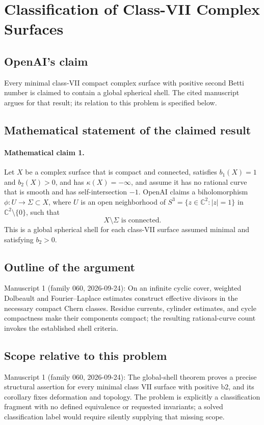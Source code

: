 \documentclass[11pt]{article}
\begin{document}
\section*{Classification of Class-VII Complex Surfaces}

\subsection{OpenAI's claim}
Every minimal class-VII compact complex surface with positive second Betti number is claimed to contain a global spherical shell. The cited manuscript argues for that result; its relation to this problem is specified below.

\subsection{Mathematical statement of the claimed result}
\paragraph{Mathematical claim 1.} Let $X$ be a complex surface that is compact and connected, satisfies $b_1(X)=1$ and $b_2(X)>0$, and has $\kappa(X)=-\infty$, and assume it has no rational curve that is smooth and has self-intersection $-1$. OpenAI claims a biholomorphism $\phi:U\to\Sigma\subset X$, where $U$ is an open neighborhood of $S^3=\{z\in\mathbb C^2:|z|=1\}$ in $\mathbb C^2\setminus\{0\}$, such that
\[
X\setminus\Sigma\text{ is connected}.
\]
This is a global spherical shell for each class-VII surface assumed minimal and satisfying $b_2>0$.

\subsection{Outline of the argument}
Manuscript 1 (family 060, 2026-09-24): On an infinite cyclic cover, weighted Dolbeault and Fourier--Laplace estimates construct effective divisors in the necessary compact Chern classes. Residue currents, cylinder estimates, and cycle compactness make their components compact; the resulting rational-curve count invokes the established shell criteria.

\subsection{Scope relative to this problem}
Manuscript 1 (family 060, 2026-09-24): The global-shell theorem proves a precise structural assertion for every minimal class VII surface with positive b2, and its corollary fixes deformation and topology. The problem is explicitly a classification fragment with no defined equivalence or requested invariants; a solved classification label would require silently supplying that missing scope.
\end{document}
